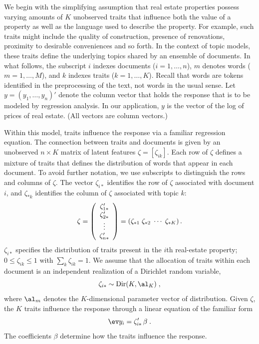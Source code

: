 \documentclass[12pt]{article}
\begin{document}
 We begin with the simplifying assumption that real estate properties possess
 varying amounts of $K$ unobserved traits that influence both the value of
 a property as well as the language used to describe the property.  For example,
 such traits might include the quality of construction, presence of renovations,
 proximity to desirable conveniences and so forth.  In the context of topic models, these traits define the underlying topics shared by an ensemble of documents.  In what follows, the subscript $i$ indexes documents ($i = 1,\ldots,n$), $m$ denotes words ($m=1,\ldots,M$), and $k$ indexes traits ($k = 1,\ldots,K$).  Recall that words are tokens identified in the preprocessing of the text, not words in the usual sense.   Let $y = (y_1,\ldots,y_n)'$ denote the column vector that holds the response that is to be modeled by regression analysis.    In our application, $y$ is the vector of the log of prices of real estate. (All vectors are column vectors.)


 Within this model, traits influence the response via a familiar regression
 equation.  The connection between traits and documents is given by an unobserved $n \times K$ matrix of latent features $\zeta = [\zeta_{ik}]$.  Each row of $\zeta$ defines a mixture of traits that defines the distribution of words that appear in each document.  To avoid further notation, we use subscripts to distinguish the rows and columns of $\zeta$.  The vector $\zeta_{i*}$ identifies the row of $\zeta$ associated with document $i$, and $\zeta_{*k}$ identifies the column of $\zeta$ associated with topic $k$:
 \begin{displaymath}
   \zeta = \left( \begin{array}{c}
                    \zeta_{1*}' \cr \zeta_{2*}' \cr \vdots \cr \zeta_{n*}'
                  \end{array}
           \right) 
         = \left( \zeta_{*1} \; \zeta_{*2} \; \cdots \; \zeta_{*K} \right).
 \end{displaymath}
 $\zeta_{i*}$ specifies the distribution of traits present in the $i$th real-estate property; $0 \le \zeta_{ik} \le 1$ with $\sum_k \zeta_{ik} = 1$.  We assume that the allocation of traits within each document is an independent realization of a Dirichlet random variable, 
 \begin{equation}
  \zeta_{i*} \sim \mbox{Dir}(K, \al_K) \;,
  \label{eq:zeta}
\end{equation}
where $\al_m$ denotes the $K$-dimensional parameter vector of distribution.    Given $\zeta$, the $K$ traits  influence the response through a linear equation of the familiar form
 \begin{equation}
    \ev y_i = \zeta_{i*}' \, \beta \;.
 \label{eq:regr}
 \end{equation}
 The coefficients $\beta$ determine how the traits influence the response.  
\end{document}

